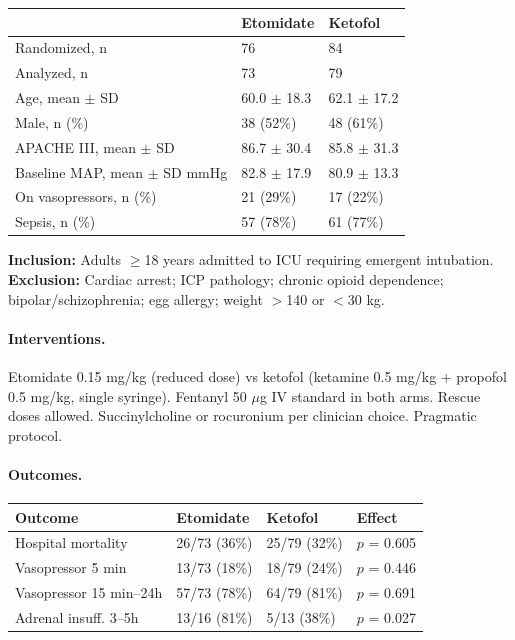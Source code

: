 \documentclass[11pt]{article}
\begin{document}
\begin{table}[H]
\centering\footnotesize
\begin{tabularx}{\textwidth}{L{4cm} C{3cm} C{3cm}}
\toprule
& \textbf{Etomidate} & \textbf{Ketofol} \\
\midrule
Randomized, n & 76 & 84 \\
Analyzed, n & 73 & 79 \\
Age, mean $\pm$ SD & 60.0 $\pm$ 18.3 & 62.1 $\pm$ 17.2 \\
Male, n (\%) & 38 (52\%) & 48 (61\%) \\
APACHE III, mean $\pm$ SD & 86.7 $\pm$ 30.4 & 85.8 $\pm$ 31.3 \\
Baseline MAP, mean $\pm$ SD mmHg & 82.8 $\pm$ 17.9 & 80.9 $\pm$ 13.3 \\
On vasopressors, n (\%) & 21 (29\%) & 17 (22\%) \\
Sepsis, n (\%) & 57 (78\%) & 61 (77\%) \\
\bottomrule
\end{tabularx}
\end{table}

\noindent\textbf{Inclusion:} Adults $\geq$18 years admitted to ICU requiring emergent intubation.\\
\textbf{Exclusion:} Cardiac arrest; ICP pathology; chronic opioid dependence; bipolar/schizophrenia; egg allergy; weight $>$140 or $<$30 kg.

\paragraph{Interventions.}
Etomidate 0.15 mg/kg (reduced dose) vs ketofol (ketamine 0.5 mg/kg + propofol 0.5 mg/kg, single syringe). Fentanyl 50 $\mu$g IV standard in both arms. Rescue doses allowed. Succinylcholine or rocuronium per clinician choice. Pragmatic protocol.

\paragraph{Outcomes.}

\begin{table}[H]
\centering\footnotesize
\begin{tabularx}{\textwidth}{L{4cm} C{2.5cm} C{2.5cm} X}
\toprule
\textbf{Outcome} & \textbf{Etomidate} & \textbf{Ketofol} & \textbf{Effect} \\
\midrule
Hospital mortality & 26/73 (36\%) & 25/79 (32\%) & $p$ = 0.605 \\
Vasopressor 5 min & 13/73 (18\%) & 18/79 (24\%) & $p$ = 0.446 \\
Vasopressor 15 min--24h & 57/73 (78\%) & 64/79 (81\%) & $p$ = 0.691 \\
Adrenal insuff. 3--5h & 13/16 (81\%) & 5/13 (38\%) & $p$ = 0.027 \\
\bottomrule
\end{tabularx}
\end{table}
\end{document}
